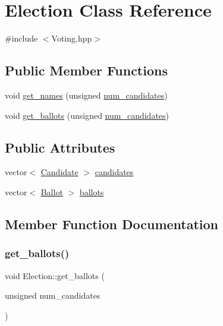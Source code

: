 \hypertarget{classElection}{}\section{Election Class Reference}
\label{classElection}


{\ttfamily \#include $<$Voting.\+hpp$>$}

\subsection*{Public Member Functions}
\begin{DoxyCompactItemize}
\item 
void \hyperlink{classElection_ad2e887d21e4a8dc2e0520d582f0e41ec}{get\+\_\+names} (unsigned \hyperlink{TestVoting_8cpp_a9639bb6e6d8e5578fe4512db9274be89}{num\+\_\+candidates})
\item 
void \hyperlink{classElection_a9feefba08be50f1aabe81c8cf3030457}{get\+\_\+ballots} (unsigned \hyperlink{TestVoting_8cpp_a9639bb6e6d8e5578fe4512db9274be89}{num\+\_\+candidates})
\end{DoxyCompactItemize}
\subsection*{Public Attributes}
\begin{DoxyCompactItemize}
\item 
vector$<$ \hyperlink{classCandidate}{Candidate} $>$ \hyperlink{classElection_a0715aedc20d195a1d88fcb2e32e14e1c}{candidates}
\item 
vector$<$ \hyperlink{classBallot}{Ballot} $>$ \hyperlink{classElection_a567625e2e211bbfc5897989b1edecaab}{ballots}
\end{DoxyCompactItemize}


\subsection{Member Function Documentation}
\mbox{\label{classElection_a9feefba08be50f1aabe81c8cf3030457}} 
\subsubsection{\texorpdfstring{get\+\_\+ballots()}{get\_ballots()}}
{\footnotesize\ttfamily void Election\+::get\+\_\+ballots (\begin{DoxyParamCaption}\item[{unsigned}]{num\+\_\+candidates }\end{DoxyParamCaption})\hspace{0.3cm}{\ttfamily [inline]}}

